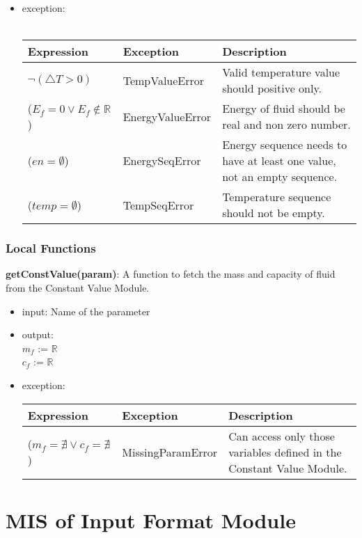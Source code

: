 \documentclass[12pt, titlepage]{article}
\begin{document}
\begin{itemize}
\item exception:  \\ \\
 \begin{tabular}{p{5cm} p{3.5cm} p{5.5cm}}
 \hline
 \textbf{Expression} & \textbf{Exception} & \textbf{Description} \\
  \hline
  $\neg ( \triangle T > 0 ) $ & TempValueError & Valid temperature value should positive only. \\ 
  \hline
    ($E_f = 0 \vee E_f \notin \mathbb{R}$) & EnergyValueError & Energy of fluid should be real and non zero number.   \\
    \hline 
        ($en = \emptyset $) & EnergySeqError & Energy sequence needs to have at least one value, not an empty sequence. \\ 
    \hline
    ($temp = \emptyset $) & TempSeqError & Temperature sequence should not be empty. \\ 
    \hline
 \end{tabular}
 
\end{itemize}

\subsubsection{Local Functions}

\textbf{getConstValue(param)}:  A function to fetch the mass and capacity of fluid from the Constant Value Module. 
\begin{itemize}
    \item  input: Name of the parameter
    \item  output: \\ $m_f$ := $\mathbb{R}$ \\ $c_f$ := $\mathbb{R}$
    \item  exception: \\

 \begin{tabular}{p{5cm} p{3.5cm} p{5.5cm}}
 \hline
 \textbf{Expression} & \textbf{Exception} & \textbf{Description} \\
  \hline
    ($m_f = \nexists \vee c_f = \nexists $) & MissingParamError & Can access only those variables defined in the Constant Value Module.  \\
    \hline
 \end{tabular}
\end{itemize}


\section{MIS of Input Format Module} \label{Input_Format_Module} 
\end{document}
